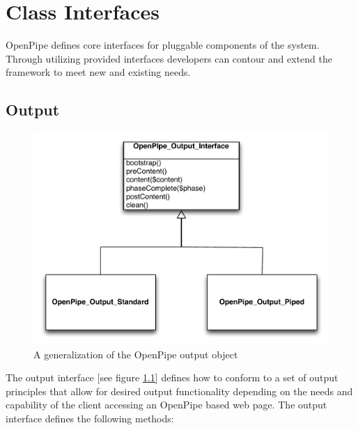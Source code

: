 \documentclass[12pt]{report}
\begin{document}

\chapter{Class Interfaces}

OpenPipe defines core interfaces for pluggable components of the system. Through utilizing provided interfaces developers can contour and extend the framework to meet new and existing needs. 

\section{Output}

\begin{figure}[H]
\caption{A generalization of the OpenPipe output object}
\label{fig:generalizationOutput}
\centering
\includegraphics[width=\textwidth,keepaspectratio]{figures/images/generalization_output.pdf}
\end{figure}

The output interface [see figure \ref{fig:generalizationOutput}] defines how to conform to a set of output principles that allow for desired output functionality depending on the needs and capability of the client accessing an OpenPipe based web page.  The output interface defines the following methods:
\end{document}
